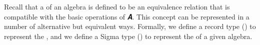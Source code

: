 
Recall that a  of an algebra  is defined to be an equivalence relation that is compatible with the basic operations of \ab 𝑨. This concept can be represented in a number of alternative but equivalent ways.  %
Formally, we define a record type () to represent the , and we define a Sigma type () to represent the  of a given algebra.
\ccpad
\begin{code}%
\>[0][@{}l@{\AgdaIndent{0}}]%
\>[1]\AgdaSpace{}%
\AgdaSpace{}%
\AgdaSymbol{(}\AgdaSpace{}%
\AgdaSymbol{:}\AgdaSpace{}%
\AgdaSpace{}%
\AgdaSpace{}%
\AgdaSymbol{)(}\AgdaSpace{}%
\AgdaSymbol{:}\AgdaSpace{}%
\AgdaSpace{}%
\AgdaSpace{}%
\AgdaSpace{}%
\AgdaSpace{}%
\AgdaSymbol{)}\AgdaSpace{}%
\AgdaSymbol{:}\AgdaSpace{}%
\AgdaSpace{}%
\AgdaSpace{}%
\AgdaSpace{}%
\AgdaSpace{}%
%
\>[70]\<%
\\
\>[1][@{}l@{\AgdaIndent{0}}]%
\>[2]\AgdaSpace{}%
\<%
\\
%
\>[2]%
\>[14]\AgdaSpace{}%
\AgdaSymbol{:}\AgdaSpace{}%
\AgdaSpace{}%
\<%
\\
%
\>[14]%
\>[29]\AgdaSymbol{:}\AgdaSpace{}%
\AgdaSpace{}%
\AgdaSpace{}%
\<%
\\
%
\\[\AgdaEmptyExtraSkip]%

\end{code}
